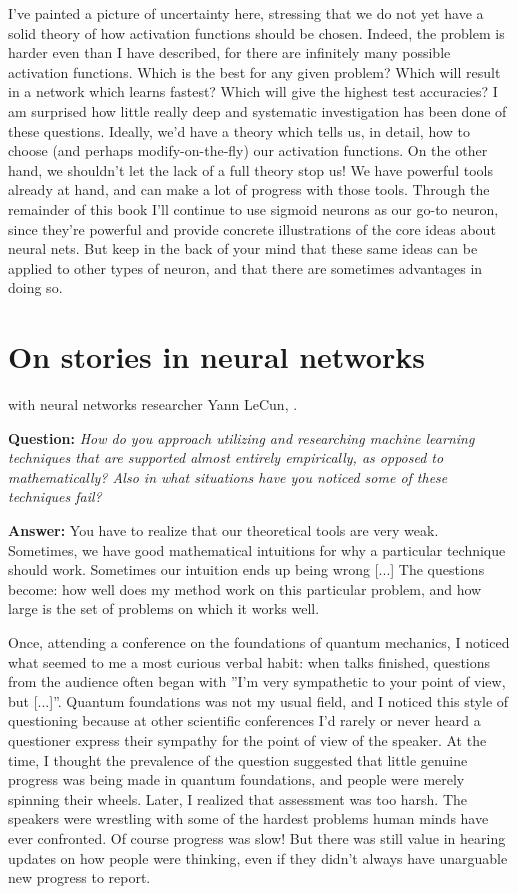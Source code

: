     I've painted a picture of uncertainty here, stressing that we do not yet have a solid theory of how activation functions should be chosen. Indeed, the problem is harder even than I have described, for there are infinitely many possible activation functions. Which is the best for any given problem? Which will result in a network which learns fastest? Which will give the highest test accuracies? I am surprised how little really deep and systematic investigation has been done of these questions. Ideally, we'd have a theory which tells us, in detail, how to choose (and perhaps modify-on-the-fly) our activation functions. On the other hand, we shouldn't let the lack of a full theory stop us! We have powerful tools already at hand, and can make a lot of progress with those tools. Through the remainder of this book I'll continue to use sigmoid neurons as our go-to neuron, since they're powerful and provide concrete illustrations of the core ideas about neural nets. But keep in the back of your mind that these same ideas can be applied to other types of neuron, and that there are sometimes advantages in doing so.


\section{On stories in neural networks}
    
 with neural networks researcher Yann LeCun, \cite{YannLeCunreddit2019}.

\textbf{ Question:} \textit{How do you approach utilizing and researching machine learning techniques that are supported almost entirely empirically, as opposed to mathematically? Also in what situations have you noticed some of these techniques fail?}
    
\textbf{Answer:} You have to realize that our theoretical tools are very weak. Sometimes, we have good mathematical intuitions for why a particular technique should work. Sometimes our intuition ends up being wrong [...] The questions become: how well does my method work on this particular problem, and how large is the set of problems on which it works well.
    
Once, attending a conference on the foundations of quantum mechanics, I noticed what seemed to me a most curious verbal habit: when talks finished, questions from the audience often began with ''I'm very sympathetic to your point of view, but [...]''. Quantum foundations was not my usual field, and I noticed this style of questioning because at other scientific conferences I'd rarely or never heard a questioner express their sympathy for the point of view of the speaker. At the time, I thought the prevalence of the question suggested that little genuine progress was being made in quantum foundations, and people were merely spinning their wheels. Later, I realized that assessment was too harsh. The speakers were wrestling with some of the hardest problems human minds have ever confronted. Of course progress was slow! But there was still value in hearing updates on how people were thinking, even if they didn't always have unarguable new progress to report.
    
